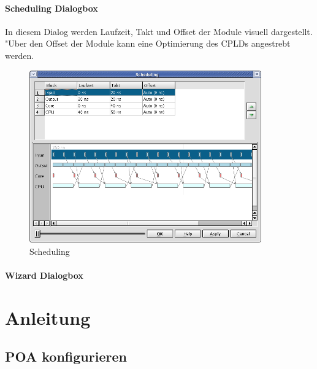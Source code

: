 \documentclass[a4paper,titlepage,12pt,ngerman]{scrbook}
\begin{document}
\subsubsection{Scheduling Dialogbox}
In diesem Dialog werden Laufzeit, Takt und Offset der Module visuell dargestellt. "Uber den Offset der Module kann eine Optimierung des CPLDs angestrebt werden.
\begin{figure}[htbp]
\begin{center}
\includegraphics[width=10cm]{Scheduling1}
\caption{Scheduling}\label{test}
\end{center}
\end{figure}

\subsubsection{Wizard Dialogbox}



\chapter{Anleitung}


\section{POA konfigurieren}
\end{document}
